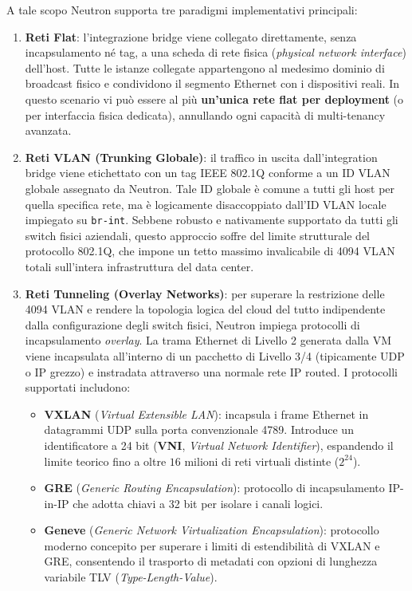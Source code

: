 \documentclass[11pt, a4paper]{article}
\begin{document}

A tale scopo Neutron supporta tre paradigmi implementativi principali:
\begin{enumerate}[leftmargin=*]
    \item \textbf{Reti Flat}: l'integrazione bridge viene collegato direttamente, senza incapsulamento né tag, a una scheda di rete fisica (\emph{physical network interface}) dell'host. Tutte le istanze collegate appartengono al medesimo dominio di broadcast fisico e condividono il segmento Ethernet con i dispositivi reali. In questo scenario vi può essere al più \textbf{un'unica rete flat per deployment} (o per interfaccia fisica dedicata), annullando ogni capacità di multi-tenancy avanzata.

    \item \textbf{Reti VLAN (Trunking Globale)}: il traffico in uscita dall'integration bridge viene etichettato con un tag IEEE 802.1Q conforme a un ID VLAN globale assegnato da Neutron. Tale ID globale è comune a tutti gli host per quella specifica rete, ma è logicamente disaccoppiato dall'ID VLAN locale impiegato su \texttt{br-int}. Sebbene robusto e nativamente supportato da tutti gli switch fisici aziendali, questo approccio soffre del limite strutturale del protocollo 802.1Q, che impone un tetto massimo invalicabile di 4094 VLAN totali sull'intera infrastruttura del data center.

    \item \textbf{Reti Tunneling (Overlay Networks)}: per superare la restrizione delle 4094 VLAN e rendere la topologia logica del cloud del tutto indipendente dalla configurazione degli switch fisici, Neutron impiega protocolli di incapsulamento \emph{overlay}. La trama Ethernet di Livello 2 generata dalla VM viene incapsulata all'interno di un pacchetto di Livello 3/4 (tipicamente UDP o IP grezzo) e instradata attraverso una normale rete IP routed. I protocolli supportati includono:
    \begin{itemize}
        \item \textbf{VXLAN} (\emph{Virtual Extensible LAN}): incapsula i frame Ethernet in datagrammi UDP sulla porta convenzionale 4789. Introduce un identificatore a 24 bit (\textbf{VNI}, \emph{Virtual Network Identifier}), espandendo il limite teorico fino a oltre $16$ milioni di reti virtuali distinte ($2^{24}$).
        \item \textbf{GRE} (\emph{Generic Routing Encapsulation}): protocollo di incapsulamento IP-in-IP che adotta chiavi a 32 bit per isolare i canali logici.
        \item \textbf{Geneve} (\emph{Generic Network Virtualization Encapsulation}): protocollo moderno concepito per superare i limiti di estendibilità di VXLAN e GRE, consentendo il trasporto di metadati con opzioni di lunghezza variabile TLV (\emph{Type-Length-Value}).
    \end{itemize}
\end{enumerate}
\end{document}
